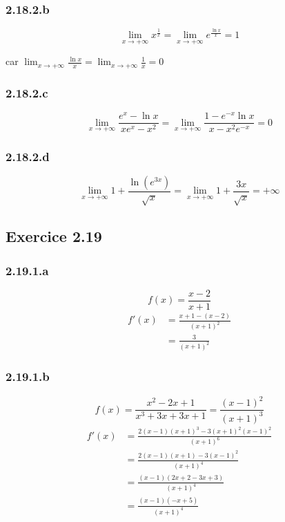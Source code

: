 \documentclass{report}
\begin{document}
\subsubsection*{2.18.2.b}
\begin{displaymath}
	\lim_{x \rightarrow +\infty} x^{\frac{1}{x}} = \lim_{x \rightarrow +\infty} e^\frac{\ln x}{x} = 1
\end{displaymath}

car $\lim_{x \rightarrow +\infty} \frac{\ln x}{x} = \lim_{x \rightarrow +\infty} \frac{1}{x} = 0$

\subsubsection*{2.18.2.c}
\begin{displaymath}
	\lim_{x \rightarrow +\infty} \frac{e^x - \ln x}{xe^x-x^2} = \lim_{x \rightarrow +\infty} \frac{1 - e^{-x}\ln x}{x-x^2e^{-x}} = 0
\end{displaymath}

\subsubsection*{2.18.2.d}
\begin{displaymath}
	\lim_{x \rightarrow +\infty} 1+ \frac{\ln (e^{3x})}{\sqrt{x}} = \lim_{x \rightarrow +\infty} 1+ \frac{3x}{\sqrt{x}} = +\infty
\end{displaymath}


\subsection*{Exercice 2.19}
\subsubsection*{2.19.1.a}
\begin{displaymath}
	f(x) = \frac{x-2}{x+1}
\end{displaymath}
\begin{equation*}
	\begin{split}
		f'(x) &=\frac{x+1 - (x-2)}{(x+1)^2}\\
		      &=\frac{3}{(x+1)^2}
	\end{split}	
\end{equation*}

\subsubsection*{2.19.1.b}
\begin{displaymath}
	f(x) = \frac{x^2-2x+1}{x^3+3x+3x+1} = \frac{(x-1)^2}{(x+1)^3}
\end{displaymath}
\begin{equation*}
	\begin{split}
		f'(x) &=\frac{2(x-1)(x+1)^3 - 3(x+1)^2(x-1)^2}{(x+1)^6}\\
		      &=\frac{2(x-1)(x+1) - 3(x-1)^2}{(x+1)^4} \\
		      &=\frac{(x-1)(2x+2-3x+3)}{(x+1)^4} \\
		      &=\frac{(x-1)(-x+5)}{(x+1)^4}
	\end{split}	
\end{equation*}
\end{document}
